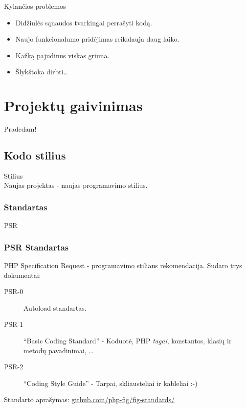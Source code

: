 \documentclass[12pt,a4paper]{beamer}
\begin{document}
\begin{frame}{Kylančios problemos}
    \begin{itemize}
        \item Didžiulės sąnaudos tvarkingai perrašyti kodą.
        \item Naujo funkcionalumo pridėjimas reikalauja daug laiko.
        \item Kažką pajudinus viskas griūna.
        \item Šlykštoka dirbti\dots
    \end{itemize}
\end{frame}

\section{Projektų gaivinimas}
\begin{frame}

    {\Huge Pradedam!}\\
\end{frame}

\subsection{Kodo stilius}
\begin{frame}

    {\Huge Stilius}\\
    Naujas projektas - naujas programavimo stilius.
\end{frame}

\begin{frame}[fragile]
    \frametitle{Standartas}

    {\Huge PSR}\\
\end{frame}

\begin{frame}
    \frametitle{PSR Standartas}
    {\large PHP Specification Request - programavimo stiliaus rekomendacija.}
    \vskip15pt
    \pause
    Sudaro trys dokumentai:
    \begin{description}
        \item[PSR-0] Autoload standartas.
        \pause
        \item[PSR-1] ``Basic Coding Standard'' - Koduotė, PHP \textit{tagai}, konstantos, klasių ir metodų pavadinimai, \dots
        \pause
        \item[PSR-2] ``Coding Style Guide'' - Tarpai, skliausteliai ir kableliai :-)
        \pause
    \end{description}
    \vskip10pt
    {\small Standarto aprašymas: \href{https://github.com/php-fig/fig-standards/}{github.com/php-fig/fig-standards/}}
\end{frame}
\end{document}
